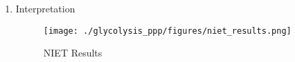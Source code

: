 \documentclass{scrartcl}
\begin{document}
\begin{enumerate}
\begin{itemize}
\item Some ammonia is released by exercising skeletal muscle directly into the circulation
\begin{itemize}
\item removed with a half-life of 20\textpm{}30 min.
\end{itemize}
\item In resting skeletal muscle ammonia is consumed rather than produced
\item \textasciitilde{}50\% of arterial ammonia can be taken up and metabolized by skeletal muscle.
\end{itemize}

\item Interpretation
\label{sec:org47b95a5}

\begin{figure}[htbp]
\centering
\texttt{[image: ./glycolysis\_ppp/figures/niet\_results.png]}
\caption[interp]{\label{fig:org7c18238}
NIET Results}
\end{figure}
\end{enumerate}
\end{document}

